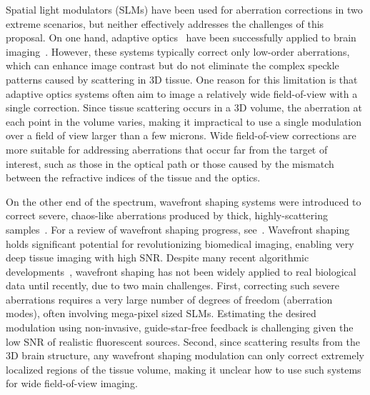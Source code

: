  
 Spatial light modulators (SLMs) have been used for aberration corrections in two extreme scenarios, but neither effectively addresses the challenges of this proposal. On one hand, adaptive optics~\cite{Booth2014,Ji2017review,HampsonBooth21review,wang2015direct} have been successfully applied to brain imaging~\cite{ji2009adaptive,ji2012characterization,Wang2014Multiplexed,Papadopoulos16,Rodriguez2021Adaptive}. However, these systems typically correct only low-order aberrations, which can enhance image contrast but do not eliminate the complex speckle patterns caused by scattering in 3D tissue. One reason for this limitation is that adaptive optics systems often aim to image a relatively wide field-of-view with a single correction. Since tissue scattering occurs in a 3D volume, the aberration at each point in the volume varies, making it impractical to use a single modulation over a field of view larger than a few microns. Wide field-of-view corrections are more suitable for addressing aberrations that occur far from the target of interest, such as those in the optical path or those caused by the mismatch between the refractive indices of the tissue and the optics.
 
 On the other end of the spectrum, wavefront shaping systems were introduced to correct severe, chaos-like aberrations produced by thick, highly-scattering samples~\cite{Vellekoop:07,Yaqoob2008,Vellekoop2010,Vellekoop2012}. For a review of wavefront shaping progress, see~\cite{Horstmeyer15,YU2015632,Gigan22}. Wavefront shaping holds significant potential for revolutionizing biomedical imaging, enabling very deep tissue imaging with high SNR. Despite many recent algorithmic developments~\cite{Horstmeyer15,Tang2012,Katz:14,Wang20142PAdaptive,Liu2018,Fiolka:12,Jang:13,Xu11,Wang2012,Kong:11,Vellekoop2012,YeminyKatz2021,Stern:19,Daniel:19,Boniface:19,Dror22}, wavefront shaping has not been widely applied to real biological data until recently, due to two main challenges. First, correcting such severe aberrations requires a very large number of degrees of freedom (aberration modes), often involving mega-pixel sized SLMs. Estimating the desired modulation using non-invasive, guide-star-free feedback is challenging given the low SNR of realistic fluorescent sources. Second, since scattering results from the 3D brain structure, any wavefront shaping modulation can only correct extremely localized regions of the tissue volume, making it unclear how to use such systems for wide field-of-view imaging.
 
 
 
